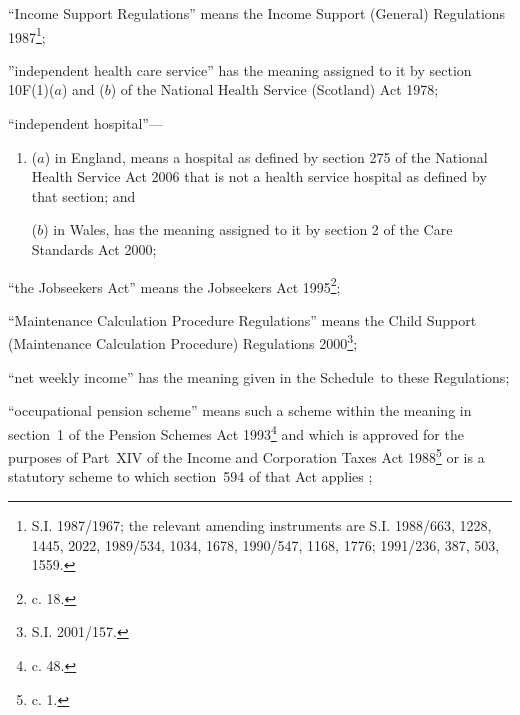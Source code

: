 \documentclass[12pt,a4paper]{article}
\begin{document}
\begin{enumerate}
“Income Support Regulations” means the Income Support (General) Regulations 1987\footnote{\frenchspacing S.I. 1987/1967; the relevant amending instruments are S.I. 1988/663, 1228, 1445, 2022, 1989/534, 1034, 1678, 1990/547, 1168, 1776; 1991/236, 387, 503, 1559.};


”independent health care service” has the meaning assigned to it by section 10F(1)($a$) and ($b$) of the National Health Service (Scotland) Act 1978;


“independent hospital”—
\begin{enumerate}\item[]
($a$)
in England, means a hospital as defined by section 275 of the National Health Service Act 2006 that is not a health service hospital as defined by that section; and

($b$)
in Wales, has the meaning assigned to it by section 2 of the Care Standards Act 2000;
\end{enumerate}

“the Jobseekers Act” means the Jobseekers Act 1995\footnote{ c. 18.};

“Maintenance Calculation Procedure Regulations” means the Child Support (Maintenance Calculation Procedure) Regulations 2000\footnote{\frenchspacing S.I. 2001/157.};

“net weekly income” has the meaning given in the Schedule~to these Regulations;


“occupational pension scheme” means such a scheme within the meaning in section~1 of the Pension Schemes Act 1993\footnote{ c. 48.} and which is approved for the purposes of Part~XIV of the Income and Corporation Taxes Act 1988\footnote{ c. 1.}
or is a statutory scheme to which section~594 of that Act applies%
;


\end{enumerate}
\end{document}
